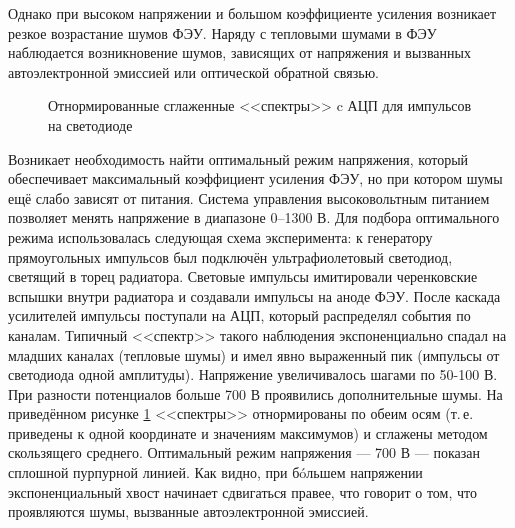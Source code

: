 \documentclass[12pt,a4paper]{report} %
\begin{document}
Однако при высоком напряжении и большом коэффициенте усиления возникает резкое возрастание шумов ФЭУ. Наряду с тепловыми шумами в ФЭУ наблюдается возникновение шумов, зависящих от напряжения и вызванных автоэлектронной эмиссией или оптической обратной связью.
\begin{figure}[th]
	\noindent{}
	\caption{Отнормированные сглаженные <<спектры>> c АЦП для импульсов на светодиоде}
	\label{UVlight}
\end{figure}

Возникает необходимость найти оптимальный режим напряжения, который обеспечивает максимальный коэффициент усиления ФЭУ, но при котором шумы ещё слабо зависят от питания. Система управления высоковольтным питанием позволяет менять напряжение в диапазоне 0--1300 В. Для подбора оптимального режима использовалась следующая схема эксперимента: к генератору прямоугольных импульсов был подключён ультрафиолетовый светодиод, светящий в торец радиатора. Световые импульсы имитировали черенковские вспышки внутри радиатора и создавали импульсы на аноде ФЭУ. После каскада усилителей импульсы поступали на АЦП, который распределял события по каналам. Типичный <<спектр>> такого наблюдения экспоненциально спадал на младших каналах (тепловые шумы) и имел явно выраженный пик (импульсы от светодиода одной амплитуды). Напряжение увеличивалось шагами по 50-100 В. При разности потенциалов больше 700 В проявились дополнительные шумы. На приведённом рисунке \ref{UVlight} <<спектры>> отнормированы по обеим осям (т.\,е. приведены к одной координате и значениям максимумов) и сглажены методом скользящего среднего. Оптимальный режим напряжения --- 700 В --- показан сплошной пурпурной линией. Как видно, при б\'oльшем напряжении экспоненциальный хвост начинает сдвигаться правее, что говорит о том, что проявляются шумы, вызванные автоэлектронной эмиссией. 
\end{document}

